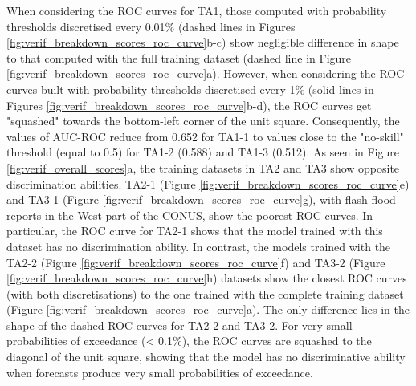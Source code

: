 When  considering the ROC curves for TA1, those computed with probability thresholds discretised every 0.01\% (dashed lines in Figures \ref{fig:verif_breakdown_scores_roc_curve}b-c) show negligible difference in shape to that computed with the full training dataset (dashed line in Figure \ref{fig:verif_breakdown_scores_roc_curve}a). However, when considering the ROC curves built with probability thresholds discretised every 1\% (solid lines in Figures \ref{fig:verif_breakdown_scores_roc_curve}b-d), the ROC curves get "squashed" towards the bottom-left corner of the unit square. Consequently, the values of AUC-ROC reduce from 0.652 for TA1-1 to values close to the "no-skill" threshold (equal to 0.5) for TA1-2 (0.588) and TA1-3 (0.512). As seen in Figure \ref{fig:verif_overall_scores}a, the training datasets in TA2 and TA3 show opposite discrimination abilities. TA2-1 (Figure \ref{fig:verif_breakdown_scores_roc_curve}e) and TA3-1 (Figure \ref{fig:verif_breakdown_scores_roc_curve}g), with flash flood reports in the West part of the CONUS, show the poorest ROC curves. In particular, the ROC curve for TA2-1 shows that the model trained with this dataset has no discrimination ability. In contrast, the models trained with the TA2-2 (Figure \ref{fig:verif_breakdown_scores_roc_curve}f) and TA3-2 (Figure \ref{fig:verif_breakdown_scores_roc_curve}h) datasets show the closest ROC curves (with both discretisations) to the one trained with the complete training dataset (Figure \ref{fig:verif_breakdown_scores_roc_curve}a). The only difference lies in the shape of the dashed ROC curves for TA2-2 and TA3-2. For very small probabilities of exceedance (< 0.1\%), the ROC curves are squashed to the diagonal of the unit square, showing that the model has no discriminative ability when forecasts produce very small probabilities of exceedance. 

